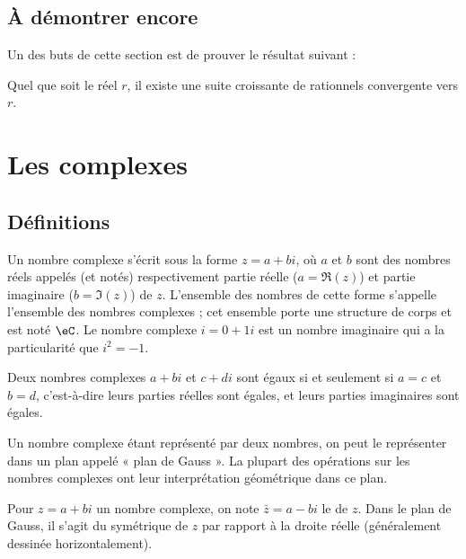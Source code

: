 \subsection{À démontrer encore}

Un des buts de cette section est de prouver le résultat suivant :
\begin{proposition} \label{PropSLCUooUFgiSR}
    Quel que soit le réel \( r\), il existe une suite croissante de rationnels convergente vers \( r\).
\end{proposition}

\section{Les complexes}

 \subsection{Définitions}
 Un nombre complexe s'écrit sous la forme $z = a + b i$, où $a$ et $b$
 sont des nombres réels appelés (et notés) respectivement partie réelle
 ($a = \Re(z)$) et partie imaginaire ($b = \Im(z)$) de $z$. L'ensemble
 des nombres de cette forme s'appelle l'ensemble des nombres complexes
 ; cet ensemble porte une structure de corps et est noté $\eC$. Le
 nombre complexe $i = 0 + 1 i$ est un nombre imaginaire qui a la
 particularité que $i^2 = -1$.

 Deux nombres complexes $a + bi$ et $c + di$ sont égaux si et seulement
 si $a = c$ et $b = d$, c'est-à-dire leurs parties réelles sont égales,
 et leurs parties imaginaires sont égales.

 Un nombre complexe étant représenté par deux nombres, on peut le
 représenter dans un plan appelé « plan de Gauss ». La plupart des
 opérations sur les nombres complexes ont leur interprétation
 géométrique dans ce plan.

 Pour $z = a + bi$ un nombre complexe, on note $\bar z = a - bi$ le
  de $z$. Dans le plan de Gauss, il s'agit du
 symétrique de $z$ par rapport à la droite réelle (généralement
 dessinée horizontalement).


